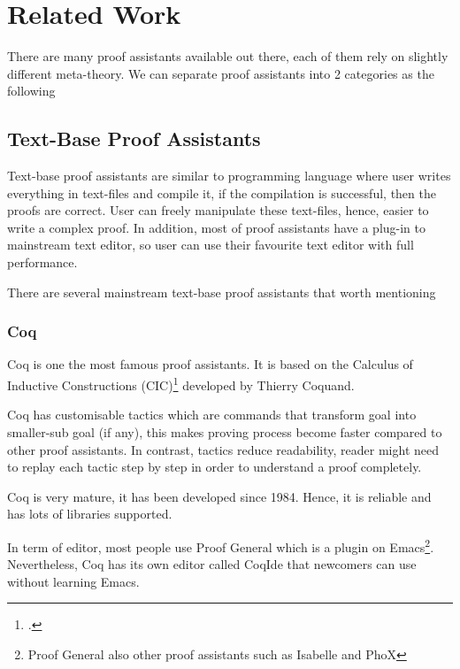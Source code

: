 \documentclass[master.tex]{subfiles}
\begin{document}
\chapter{Related Work}

There are many proof assistants available out there, each of them rely on
slightly different meta-theory. We can separate proof assistants into 2
categories as the following

\section{Text-Base Proof Assistants}

Text-base proof assistants are similar to programming language where user writes
everything in text-files and compile it, if the compilation is successful, then
the proofs are correct. User can freely manipulate these text-files, hence,
easier to write a complex proof. In addition, most of proof assistants have a
plug-in to mainstream text editor, so user can use their favourite text editor
with full performance.

There are several mainstream text-base proof assistants that worth mentioning

\subsection{Coq}
Coq\supercite{coq-official-website} is one the most famous proof assistants. It
is based on the Calculus of Inductive Constructions (CIC)\footcite{CIC is itself
  is developed alongside Coq.} developed by Thierry
Coquand\supercite{thierry-coquand-homepage}.

Coq has customisable tactics which are commands that transform goal into
smaller-sub goal (if any), this makes proving process become faster compared to
other proof assistants. In contrast, tactics reduce readability, reader might
need to replay each tactic step by step in order to understand a proof
completely.

Coq is very mature, it has been developed since 1984. Hence, it is reliable and
has lots of libraries supported.

In term of editor, most people use Proof
General\supercite{proof-general-official-website} which is a plugin on
Emacs\footnote{Proof General also other proof assistants such as Isabelle and PhoX}.
Nevertheless, Coq has its own editor called
CoqIde\supercite{coqide-official-website} that newcomers can use without
learning Emacs.
\end{document}
